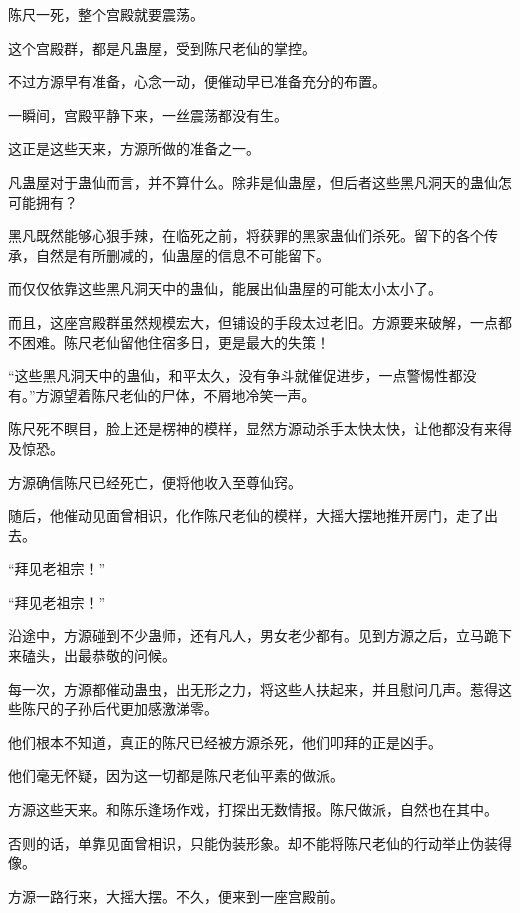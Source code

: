 
\begin{this_body}



陈尺一死，整个宫殿就要震荡。

这个宫殿群，都是凡蛊屋，受到陈尺老仙的掌控。

不过方源早有准备，心念一动，便催动早已准备充分的布置。

一瞬间，宫殿平静下来，一丝震荡都没有生。

这正是这些天来，方源所做的准备之一。

凡蛊屋对于蛊仙而言，并不算什么。除非是仙蛊屋，但后者这些黑凡洞天的蛊仙怎可能拥有？

黑凡既然能够心狠手辣，在临死之前，将获罪的黑家蛊仙们杀死。留下的各个传承，自然是有所删减的，仙蛊屋的信息不可能留下。

而仅仅依靠这些黑凡洞天中的蛊仙，能展出仙蛊屋的可能太小太小了。

而且，这座宫殿群虽然规模宏大，但铺设的手段太过老旧。方源要来破解，一点都不困难。陈尺老仙留他住宿多日，更是最大的失策！

“这些黑凡洞天中的蛊仙，和平太久，没有争斗就催促进步，一点警惕性都没有。”方源望着陈尺老仙的尸体，不屑地冷笑一声。

陈尺死不瞑目，脸上还是楞神的模样，显然方源动杀手太快太快，让他都没有来得及惊恐。

方源确信陈尺已经死亡，便将他收入至尊仙窍。

随后，他催动见面曾相识，化作陈尺老仙的模样，大摇大摆地推开房门，走了出去。

“拜见老祖宗！”

“拜见老祖宗！”

沿途中，方源碰到不少蛊师，还有凡人，男女老少都有。见到方源之后，立马跪下来磕头，出最恭敬的问候。

每一次，方源都催动蛊虫，出无形之力，将这些人扶起来，并且慰问几声。惹得这些陈尺的子孙后代更加感激涕零。

他们根本不知道，真正的陈尺已经被方源杀死，他们叩拜的正是凶手。

他们毫无怀疑，因为这一切都是陈尺老仙平素的做派。

方源这些天来。和陈乐逢场作戏，打探出无数情报。陈尺做派，自然也在其中。

否则的话，单靠见面曾相识，只能伪装形象。却不能将陈尺老仙的行动举止伪装得像。

方源一路行来，大摇大摆。不久，便来到一座宫殿前。


\end{this_body}
